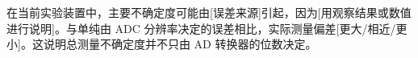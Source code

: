 在当前实验装置中，主要不确定度可能由[误差来源]引起，因为[用观察结果或数值进行说明]。与单纯由 ADC 分辨率决定的误差相比，实际测量偏差[更大/相近/更小]。这说明总测量不确定度并不只由 AD 转换器的位数决定。
